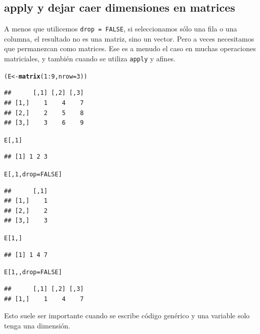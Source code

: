 \documentclass{config/apuntes}\usepackage[]{graphicx}\usepackage[]{xcolor}
\makeatletter
\newcommand{\hlnum}[1]{\textcolor[rgb]{0.686,0.059,0.569}{#1}}%
\newcommand{\hlopt}[1]{\textcolor[rgb]{0,0,0}{#1}}%
\newcommand{\hldef}[1]{\textcolor[rgb]{0.345,0.345,0.345}{#1}}%
\newcommand{\hlkwb}[1]{\textcolor[rgb]{0.69,0.353,0.396}{#1}}%
\newcommand{\hlkwc}[1]{\textcolor[rgb]{0.333,0.667,0.333}{#1}}%
\newcommand{\hlkwd}[1]{\textcolor[rgb]{0.737,0.353,0.396}{\textbf{#1}}}%
\newenvironment{kframe}{%
 \def\at@end@of@kframe{}%
 \ifinner\ifhmode%
  \def\at@end@of@kframe{\end{minipage}}%
  \begin{minipage}{\columnwidth}%
 \fi\fi%
 \def\FrameCommand##1{\hskip\@totalleftmargin \hskip-\fboxsep
 \colorbox{shadecolor}{##1}\hskip-\fboxsep
     \hskip-\linewidth \hskip-\@totalleftmargin \hskip\columnwidth}%
 \MakeFramed {\advance\hsize-\width
   \@totalleftmargin\z@ \linewidth\hsize
   \@setminipage}}%
 {\par\unskip\endMakeFramed%
 \at@end@of@kframe}
\newenvironment{knitrout}{}{} %
\newcommand{\code}[1]{\texttt{#1}}
\makeatother
\begin{document}
\subsection{apply y dejar caer dimensiones en matrices}
A menos que utilicemos \code{drop = FALSE}, si seleccionamos sólo una fila o una columna, el resultado no es una matriz, sino un vector. Pero a veces necesitamos que permanezcan como matrices. Ese es a menudo el caso en muchas operaciones matriciales, y también cuando se utiliza \code{apply} y afines.
\begin{knitrout}
\color{fgcolor}\begin{kframe}
\begin{alltt}
\hldef{(E} \hlkwb{<-} \hlkwd{matrix}\hldef{(}\hlnum{1}\hlopt{:}\hlnum{9}\hldef{,} \hlkwc{nrow} \hldef{=} \hlnum{3}\hldef{))}
\end{alltt}
\begin{verbatim}
##      [,1] [,2] [,3]
## [1,]    1    4    7
## [2,]    2    5    8
## [3,]    3    6    9
\end{verbatim}
\begin{alltt}
\hldef{E[,} \hlnum{1}\hldef{]}
\end{alltt}
\begin{verbatim}
## [1] 1 2 3
\end{verbatim}
\begin{alltt}
\hldef{E[,} \hlnum{1}\hldef{,} \hlkwc{drop} \hldef{=} \hlnum{FALSE}\hldef{]}
\end{alltt}
\begin{verbatim}
##      [,1]
## [1,]    1
## [2,]    2
## [3,]    3
\end{verbatim}
\begin{alltt}
\hldef{E[}\hlnum{1}\hldef{, ]}
\end{alltt}
\begin{verbatim}
## [1] 1 4 7
\end{verbatim}
\begin{alltt}
\hldef{E[}\hlnum{1}\hldef{, ,} \hlkwc{drop} \hldef{=} \hlnum{FALSE}\hldef{]}
\end{alltt}
\begin{verbatim}
##      [,1] [,2] [,3]
## [1,]    1    4    7
\end{verbatim}
\end{kframe}
\end{knitrout}

Esto suele ser importante cuando se escribe código genérico y una variable solo tenga una dimensión.
\end{document}
